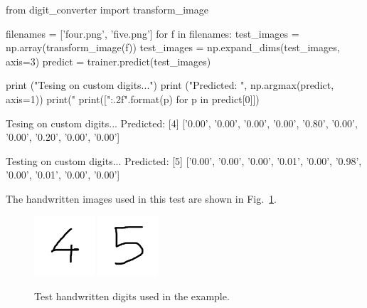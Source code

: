 \begin{ipython}
from digit_converter import transform_image

filenames = ['four.png', 'five.png']
for f in filenames:
    test_images = np.array(transform_image(f))
test_images = np.expand_dims(test_images, axis=3)
predict = trainer.predict(test_images)

print ("Tesing on custom digits...")
print ("Predicted: ", np.argmax(predict, axis=1))
print("%
print(["{:.2f}".format(p) for p in predict[0]])
\end{ipython}
\begin{ioutput}
Tesing on custom digits...
Predicted:  [4]
['0.00', '0.00', '0.00', '0.00', '0.80', '0.00', '0.00', '0.20', '0.00', 
'0.00']

Testing on custom digits...
Predicted:  [5]
['0.00', '0.00', '0.00', '0.01', '0.00', '0.98', '0.00', '0.01', '0.00', 
'0.00']
\end{ioutput}
The handwritten images used in this test are shown in Fig.~\ref{fig:test_images}.

\begin{figure}[htb]
\centering
\includegraphics[width=0.2\textwidth]{figures/four.png}
\includegraphics[width=0.2\textwidth]{figures/five.png}
\caption{Test handwritten digits used in the example.}
\label{fig:test_images}
\end{figure}

